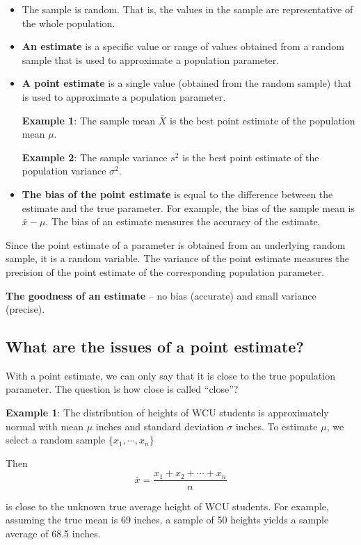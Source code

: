 \documentclass[
]{book}
\begin{document}
\begin{itemize}
\item
  The sample is random. That is, the values in the sample are representative of the whole population.
\item
  \textbf{An estimate} is a specific value or range of values obtained from a random sample that is used to approximate a population parameter.
\item
  \textbf{A point estimate} is a single value (obtained from the random sample) that is used to approximate a population parameter.

  \textbf{Example 1}: The sample mean \(\bar{X}\) is the best point estimate of the population mean \(\mu\).

  \textbf{Example 2}: The sample variance \(s^2\) is the best point estimate of the population variance \(\sigma^2\).
\item
  \textbf{The bias of the point estimate} is equal to the difference between the estimate and the true parameter. For example, the bias of the sample mean is \(\bar{x} -\mu\). The bias of an estimate measures the accuracy of the estimate.
\end{itemize}

Since the point estimate of a parameter is obtained from an underlying random sample, it is a random variable. The variance of the point estimate measures the precision of the point estimate of the corresponding population parameter.

\textbf{The goodness of an estimate} -- no bias (accurate) and small variance (precise).

\hypertarget{what-are-the-issues-of-a-point-estimate}{%
\subsection{What are the issues of a point estimate?}\label{what-are-the-issues-of-a-point-estimate}}

With a point estimate, we can only say that it is close to the true population parameter. The question is how close is called ``close''?

\textbf{Example 1}: The distribution of heights of WCU students is approximately normal with mean \(\mu\) inches and standard deviation \(\sigma\) inches. To estimate \(\mu\), we select a random sample \(\{x_1, \cdots ,x_n\}\)

Then
\[
\bar{x} = \frac{x_1 + x_2 + \cdots + x_n}{n}
\]

is close to the unknown true average height of WCU students. For example, assuming the true mean is 69 inches, a sample of 50 heights yields a sample average of 68.5 inches.
\end{document}
